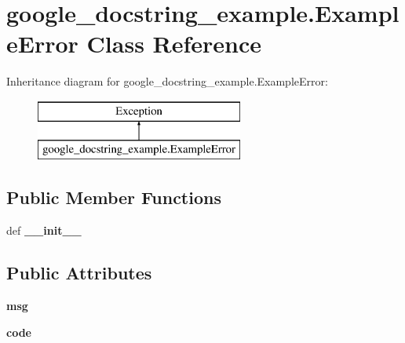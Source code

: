 \hypertarget{classgoogle__docstring__example_1_1ExampleError}{\section{google\-\_\-docstring\-\_\-example.\-Example\-Error Class Reference}
\label{classgoogle__docstring__example_1_1ExampleError}
}
Inheritance diagram for google\-\_\-docstring\-\_\-example.\-Example\-Error\-:\begin{figure}[H]
\begin{center}
\leavevmode
\includegraphics[height=2.000000cm]{classgoogle__docstring__example_1_1ExampleError}
\end{center}
\end{figure}
\subsection*{Public Member Functions}
\begin{DoxyCompactItemize}
\item 
\hypertarget{classgoogle__docstring__example_1_1ExampleError_a7f82075efd3e0aef9e7db900ea7dd961}{def {\bfseries \-\_\-\-\_\-init\-\_\-\-\_\-}}\label{classgoogle__docstring__example_1_1ExampleError_a7f82075efd3e0aef9e7db900ea7dd961}

\end{DoxyCompactItemize}
\subsection*{Public Attributes}
\begin{DoxyCompactItemize}
\item 
\hypertarget{classgoogle__docstring__example_1_1ExampleError_aa84a97ad68bbe5f5e5b96598396a3ae0}{{\bfseries msg}}\label{classgoogle__docstring__example_1_1ExampleError_aa84a97ad68bbe5f5e5b96598396a3ae0}

\item 
\hypertarget{classgoogle__docstring__example_1_1ExampleError_a749126a25024f84564afcba15a8b7b0f}{{\bfseries code}}\label{classgoogle__docstring__example_1_1ExampleError_a749126a25024f84564afcba15a8b7b0f}

\end{DoxyCompactItemize}



